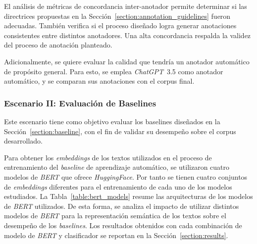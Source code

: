 El an\'alisis de m\'etricas de concordancia inter-anotador permite determinar si las directrices propuestas en la 
Secci\'on~\ref{section:annotation_guidelines} fueron adecuadas. Tambi\'en verifica si el proceso dise\~nado logra generar
anotaciones consistentes entre distintos anotadores. Una alta concordancia respalda la validez del proceso de anotaci\'on
planteado.

Adicionalmente, se quiere evaluar la calidad que tendr\'ia un anotador autom\'atico de prop\'osito general. Para esto, se 
emplea \emph{ChatGPT}~3.5 como anotador autom\'atico, y se comparan sus anotaciones con el corpus final.

\subsubsection{Escenario II: Evaluaci\'on de Baselines}
Este escenario tiene como objetivo evaluar los baselines dise\~nados en la Secci\'on~\ref{section:baseline}, con el fin de 
validar su desempe\~no sobre el corpus desarrollado.

Para obtener los \emph{embeddings} de los textos utilizados en el proceso de entrenamiento del \emph{baseline} 
de aprendizaje autom\'atico, se utilizaron cuatro modelos de \emph{BERT} que ofrece \emph{HuggingFace}.
Por tanto se tienen cuatro conjuntos de \emph{embeddings} diferentes para el entrenamiento de cada uno de 
los modelos estudiados. La Tabla~\ref{table:bert_models} resume las arquitecturas de los modelos de \emph{BERT} utilizados.
De esta forma, se analiza el impacto de utilizar distintos modelos de \emph{BERT} para la representaci\'on 
sem\'antica de los textos sobre el desempe\~no de los \emph{baselines}. Los resultados obtenidos con cada 
combinaci\'on de modelo de \emph{BERT} y clasificador se reportan en la Secci\'on~\ref{section:results}.

\begin{table}[htpb]
    \centering
    \caption{Comparativa de modelos de \emph{BERT} utilizados.}
    \label{table:bert_models}
\end{table}

